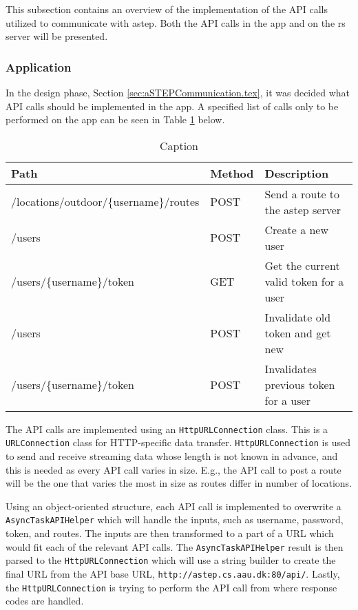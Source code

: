 This subsection contains an overview of the implementation of the API calls utilized to communicate with \gls{astep}.
Both the API calls in the app and on the \gls{rs} server will be presented.

 \subsubsection{Application}
In the design phase, Section \ref{sec:aSTEPCommunication.tex}, it was decided what API calls should be implemented in the app.
A specified list of calls only to be performed on the app can be seen in Table \ref{tab:asteprequests} below.

\begin{table}[h]
	\centering
	\scriptsize
	\begin{tabular}{l l l}
		Path & Method & Description\\\midrule
		/locations/outdoor/\{username\}/routes & POST & Send a route to the \gls{astep} server\\
		/users & POST & Create a new user\\
		/users/\{username\}/token & GET & Get the current valid token for a user\\
		/users & POST & Invalidate old token and get new\\
		/users/\{username\}/token & POST & Invalidates previous token for a user\\
	\end{tabular}
	\caption{Caption}
	\label{tab:asteprequests}
\end{table} 

The API calls are implemented using an \texttt{HttpURLConnection} class.
This is a \texttt{URLConnection} class for HTTP-specific data transfer.
\texttt{HttpURLConnection} is used to send and receive streaming data whose length is not known in advance, and this is needed as every API call varies in size.
E.g., the API call to post a route will be the one that varies the most in size as routes differ in number of locations.

Using an object-oriented structure, each API call is implemented to overwrite a \texttt{AsyncTaskAPIHelper} which will handle the inputs, such as username, password, token, and routes.
The inputs are then transformed to a part of a URL which would fit each of the relevant API calls.
The \texttt{AsyncTaskAPIHelper} result is then parsed to the \texttt{HttpURLConnection} which will use a string builder to create the final URL from the API base URL, \texttt{http://astep.cs.aau.dk:80/api/}.
Lastly, the \texttt{HttpURLConnection} is trying to perform the API call from where response codes are handled.

